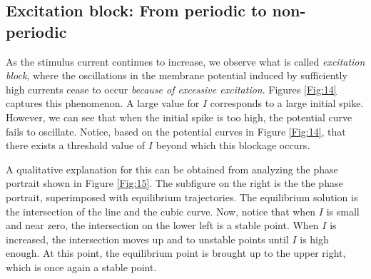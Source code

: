 \documentclass{book}
\theoremstyle{definition}
\begin{document}
\subsection{Excitation block: From periodic to non-periodic}

As the stimulus current continues to increase, we observe what is called \textit{excitation block}, where the oscillations in the membrane potential induced by sufficiently high currents cease to occur \textit{because of excessive excitation}. Figures \ref{Fig:14} captures this phenomenon. A large value for $I$ corresponds to a large initial spike. However, we can see that when the initial spike is too high, the potential curve fails to oscillate. Notice, based on the potential curves in Figure \ref{Fig:14}, that there exists a threshold value of $I$ beyond which this blockage occurs.

A qualitative explanation for this can be obtained from analyzing the phase portrait shown in Figure \ref{Fig:15}. The subfigure on the right is the the phase portrait, superimposed with equilibrium trajectories. The equilibrium solution is the intersection of the line and the cubic curve. Now, notice that when $I$ is small and near zero, the intersection on the lower left is a stable point. When $I$ is increased, the intersection moves up and to unstable points until $I$ is high enough. At this point, the equilibrium point is brought up to the upper right, which is once again a stable point. 
\end{document}

